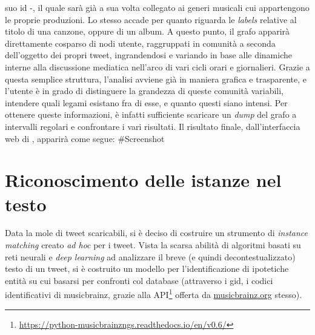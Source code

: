 \documentclass[12pt, a4paper, twocolumn]{article} %
\begin{document}
suo id -, il quale sarà già a sua volta collegato ai generi musicali cui appartengono le proprie produzioni. Lo stesso accade per quanto riguarda le \textit{labels} relative al titolo di una canzone, oppure di un album. A questo punto, il grafo apparirà direttamente cosparso di nodi utente, raggruppati in comunità a seconda dell'oggetto dei propri tweet, ingrandendosi e variando in base alle dinamiche interne alla discussione mediatica nell'arco di vari cicli orari e giornalieri. Grazie a questa semplice struttura, l'analisi avviene già in maniera grafica e trasparente, e l'utente è in grado di distinguere la grandezza di queste comunità variabili, intendere quali legami esistano fra di esse, e quanto questi siano intensi. Per ottenere queste informazioni, è infatti sufficiente scaricare un \textit{dump} del grafo a intervalli regolari e confrontare i vari risultati. Il risultato finale, dall'interfaccia web di , apparirà come segue:
#Screenshot

\section{Riconoscimento delle istanze nel testo}
Data la mole di tweet scaricabili, si è deciso di costruire un strumento di \textit{instance matching} creato \textit{ad hoc} per i tweet.
Vista la scarsa abilità di algoritmi basati su reti neurali e \textit{deep learning} ad analizzare il breve (e quindi decontestualizzato) testo di un tweet, si è costruito un modello per l'identificazione di ipotetiche entità su cui basarsi per confronti col database (attraverso i gid, i codici identificativi di musicbrainz, grazie alla API\footnote{\url{https://python-musicbrainzngs.readthedocs.io/en/v0.6/}} offerta da \url{musicbrainz.org} stesso).
\end{document}
